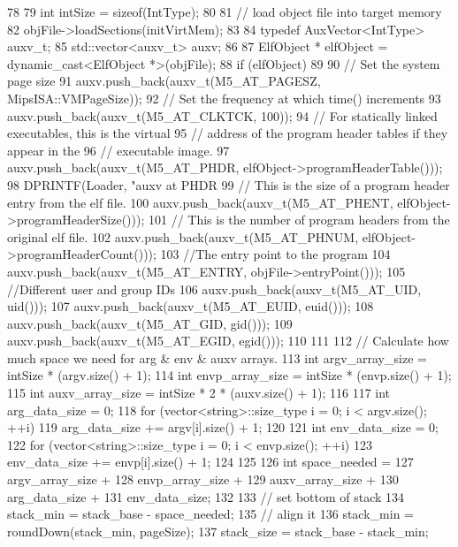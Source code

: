 \begin{DoxyCode}
78 {
79     int intSize = sizeof(IntType);
80 
81     // load object file into target memory
82     objFile->loadSections(initVirtMem);
83 
84     typedef AuxVector<IntType> auxv_t;
85     std::vector<auxv_t> auxv;
86 
87     ElfObject * elfObject = dynamic_cast<ElfObject *>(objFile);
88     if (elfObject)
89     {
90         // Set the system page size
91         auxv.push_back(auxv_t(M5_AT_PAGESZ, MipsISA::VMPageSize));
92         // Set the frequency at which time() increments
93         auxv.push_back(auxv_t(M5_AT_CLKTCK, 100));
94         // For statically linked executables, this is the virtual
95         // address of the program header tables if they appear in the
96         // executable image.
97         auxv.push_back(auxv_t(M5_AT_PHDR, elfObject->programHeaderTable()));
98         DPRINTF(Loader, "auxv at PHDR %
99         // This is the size of a program header entry from the elf file.
100         auxv.push_back(auxv_t(M5_AT_PHENT, elfObject->programHeaderSize()));
101         // This is the number of program headers from the original elf file.
102         auxv.push_back(auxv_t(M5_AT_PHNUM, elfObject->programHeaderCount()));
103         //The entry point to the program
104         auxv.push_back(auxv_t(M5_AT_ENTRY, objFile->entryPoint()));
105         //Different user and group IDs
106         auxv.push_back(auxv_t(M5_AT_UID, uid()));
107         auxv.push_back(auxv_t(M5_AT_EUID, euid()));
108         auxv.push_back(auxv_t(M5_AT_GID, gid()));
109         auxv.push_back(auxv_t(M5_AT_EGID, egid()));
110     }
111 
112     // Calculate how much space we need for arg & env & auxv arrays.
113     int argv_array_size = intSize * (argv.size() + 1);
114     int envp_array_size = intSize * (envp.size() + 1);
115     int auxv_array_size = intSize * 2 * (auxv.size() + 1);
116 
117     int arg_data_size = 0;
118     for (vector<string>::size_type i = 0; i < argv.size(); ++i) {
119         arg_data_size += argv[i].size() + 1;
120     }
121     int env_data_size = 0;
122     for (vector<string>::size_type i = 0; i < envp.size(); ++i) {
123         env_data_size += envp[i].size() + 1;
124     }
125 
126     int space_needed =
127         argv_array_size +
128         envp_array_size +
129         auxv_array_size +
130         arg_data_size +
131         env_data_size;
132 
133     // set bottom of stack
134     stack_min = stack_base - space_needed;
135     // align it
136     stack_min = roundDown(stack_min, pageSize);
137     stack_size = stack_base - stack_min;
}
\end{DoxyCode}

